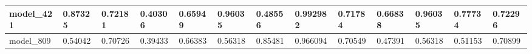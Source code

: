 \begin{tabular}{|l|l|l|l|l|l|l|l|l|l|l|l|l|}
model\_421     & 0.87325     & 0.72181        & 0.40306      & 0.65949          & 0.96035              & 0.48556              & 0.992982     & 0.71784           & 0.66838            & 0.96035         & 0.77734     & 0.72296      \\ \hline
model\_809     & 0.54042     & 0.70726        & 0.39433      & 0.66383          & 0.56318              & 0.85481              & 0.966094     & 0.70549           & 0.47391            & 0.56318         & 0.51153     & 0.70899      \\ \hline
\end{tabular}